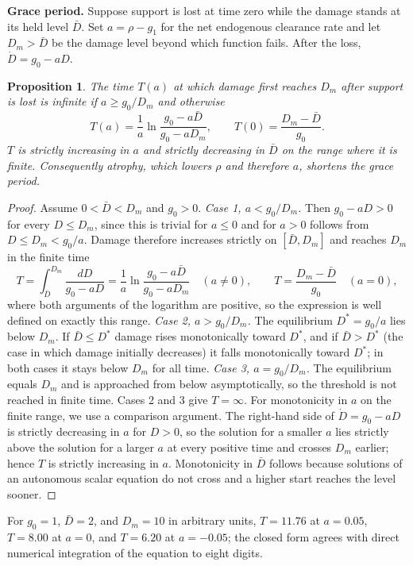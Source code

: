 \documentclass[11pt]{article}
\theoremstyle{plain}
\newtheorem{proposition}{Proposition}
\theoremstyle{definition}
\theoremstyle{remark}
\begin{document}
\textbf{Grace period.} Suppose support is lost at time zero while the damage stands at its held level $\bar D$. Set $a=\rho-g_1$ for the net endogenous clearance rate and let $D_m>\bar D$ be the damage level beyond which function fails. After the loss, $\dot D=g_0-aD$.

\begin{proposition}\label{prop:grace}
The time $T(a)$ at which damage first reaches $D_m$ after support is lost is infinite if $a\ge g_0/D_m$ and otherwise
\[
T(a)=\frac1a\ln\frac{g_0-a\bar D}{g_0-aD_m},\qquad T(0)=\frac{D_m-\bar D}{g_0}.
\]
$T$ is strictly increasing in $a$ and strictly decreasing in $\bar D$ on the range where it is finite. Consequently atrophy, which lowers $\rho$ and therefore $a$, shortens the grace period.
\end{proposition}

\begin{proof}
Assume $0<\bar D<D_m$ and $g_0>0$. \emph{Case 1, $a<g_0/D_m$.} Then $g_0-aD>0$ for every $D\le D_m$, since this is trivial for $a\le0$ and for $a>0$ follows from $D\le D_m<g_0/a$. Damage therefore increases strictly on $[\bar D,D_m]$ and reaches $D_m$ in the finite time
\[
T=\int_{\bar D}^{D_m}\frac{dD}{g_0-aD}=\frac1a\ln\frac{g_0-a\bar D}{g_0-aD_m}\quad(a\ne0),\qquad T=\frac{D_m-\bar D}{g_0}\quad(a=0),
\]
where both arguments of the logarithm are positive, so the expression is well defined on exactly this range. \emph{Case 2, $a>g_0/D_m$.} The equilibrium $D^\ast=g_0/a$ lies below $D_m$. If $\bar D\le D^\ast$ damage rises monotonically toward $D^\ast$, and if $\bar D>D^\ast$ (the case in which damage initially decreases) it falls monotonically toward $D^\ast$; in both cases it stays below $D_m$ for all time. \emph{Case 3, $a=g_0/D_m$.} The equilibrium equals $D_m$ and is approached from below asymptotically, so the threshold is not reached in finite time. Cases 2 and 3 give $T=\infty$. For monotonicity in $a$ on the finite range, we use a comparison argument. The right-hand side of $\dot D=g_0-aD$ is strictly decreasing in $a$ for $D>0$, so the solution for a smaller $a$ lies strictly above the solution for a larger $a$ at every positive time and crosses $D_m$ earlier; hence $T$ is strictly increasing in $a$. Monotonicity in $\bar D$ follows because solutions of an autonomous scalar equation do not cross and a higher start reaches the level sooner.
\end{proof}

For $g_0=1$, $\bar D=2$, and $D_m=10$ in arbitrary units, $T=11.76$ at $a=0.05$, $T=8.00$ at $a=0$, and $T=6.20$ at $a=-0.05$; the closed form agrees with direct numerical integration of the equation to eight digits.
\end{document}
